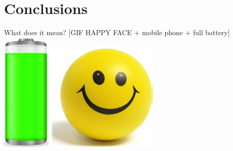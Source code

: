 \documentclass[a2,landscape]{a0poster}
\begin{document}
\section*{Conclusions}
What does it mean?
[GIF HAPPY FACE + mobile phone + full battery]\\
\centering
\includegraphics[scale=0.7]{plots/full_battery}
\includegraphics[scale=0.7]{plots/happy_face}
\end{document}
